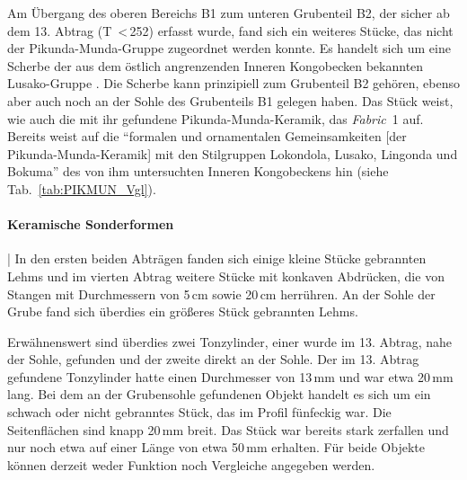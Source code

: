 Am Übergang des oberen Bereichs B1 zum unteren Grubenteil B2, der sicher ab dem 13. Abtrag (T~\textless\,252) erfasst wurde, fand sich ein weiteres Stücke, das nicht der Pikunda-Munda-Gruppe zugeordnet werden konnte. Es handelt sich um eine Scherbe der aus dem östlich angrenzenden Inneren Kongobecken bekannten Lusako-Gruppe \parencites[Taf.~45.16;][18 Abb.~4.1]{Eggert.1992}[104--107]{Wotzka.1995}. Die Scherbe kann prinzipiell zum Grubenteil B2 gehören, ebenso aber auch noch an der Sohle des Grubenteils B1 gelegen haben. Das Stück weist, wie auch die mit ihr gefundene Pikunda-Munda-Keramik, das \textit{Fabric}~1 auf. Bereits \textcite[107]{Wotzka.1995} weist auf die \enquote{formalen und ornamentalen Gemeinsamkeiten [der Pikunda-Munda-Keramik] mit den Stilgruppen Lokondola, Lusako, Lingonda und Bokuma} des von ihm untersuchten Inneren Kongobeckens hin (siehe Tab.~\ref{tab:PIKMUN_Vgl}).

\paragraph{Keramische Sonderformen}\hspace{-.5em}|\hspace{.5em}%
In den ersten beiden Abträgen fanden sich einige kleine Stücke gebrannten Lehms und im vierten Abtrag weitere Stücke mit konkaven Abdrücken, die von Stangen mit Durchmessern von 5\,cm sowie 20\,cm herrühren. An der Sohle der Grube fand sich überdies ein größeres Stück gebrannten Lehms.

Erwähnenswert sind überdies zwei Tonzylinder, einer wurde im 13. Abtrag, nahe der Sohle, gefunden und der zweite direkt an der Sohle. Der im 13. Abtrag gefundene Tonzylinder hatte einen Durchmesser von 13\,mm und war etwa 20\,mm lang. Bei dem an der Grubensohle gefundenen Objekt handelt es sich um ein schwach oder nicht gebranntes Stück, das im Profil fünfeckig war. Die Seitenflächen sind knapp 20\,mm breit. Das Stück war bereits stark zerfallen und nur noch etwa auf einer Länge von etwa 50\,mm erhalten. Für beide Objekte können derzeit weder Funktion noch Vergleiche angegeben werden.

